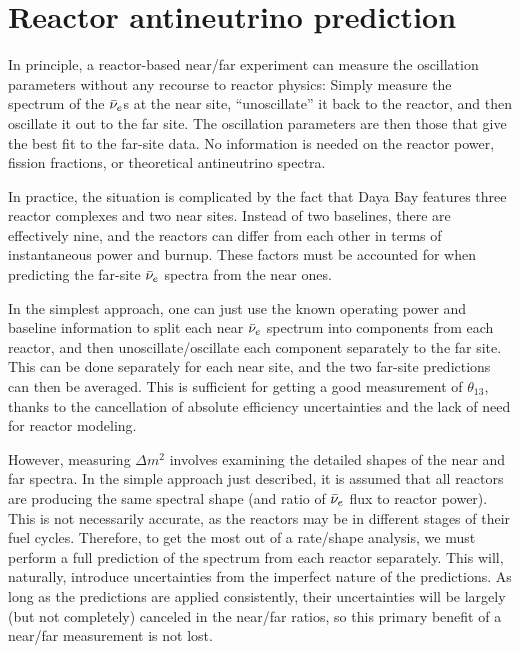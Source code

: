 \documentclass[../thesis.tex]{subfiles}
\begin{document}
\chapter{Reactor antineutrino prediction}
\label{chap:reactor}

\begin{comment}
Note to self: See Kam-Biu's comments on first page of Reactor.pdf. Add SNF plot from DocDB. Also NE corrections (tabulate or plot, take from [Lewis] or [Mueller]?)
\end{comment}

In principle, a reactor-based near/far experiment can measure the oscillation parameters without any recourse to reactor physics: Simply measure the spectrum of the $\bar\nu_e$s at the near site, ``unoscillate'' it back to the reactor, and then oscillate it out to the far site. The oscillation parameters are then those that give the best fit to the far-site data. No information is needed on the reactor power, fission fractions, or theoretical antineutrino spectra.

In practice, the situation is complicated by the fact that Daya Bay features three reactor complexes and two near sites. Instead of two baselines, there are effectively nine, and the reactors can differ from each other in terms of instantaneous power and burnup. These factors must be accounted for when predicting the far-site $\bar\nu_e$ spectra from the near ones.

In the simplest approach, one can just use the known operating power and baseline information to split each near $\bar\nu_e$ spectrum into components from each reactor, and then unoscillate/oscillate each component separately to the far site. This can be done separately for each near site, and the two far-site predictions can then be averaged. This is sufficient for getting a good measurement of $\theta_{13}$, thanks to the cancellation of absolute efficiency uncertainties and the lack of need for reactor modeling.

However, measuring $\Delta m^2$ involves examining the detailed shapes of the near and far spectra. In the simple approach just described, it is assumed that all reactors are producing the same spectral shape (and ratio of $\bar\nu_e$ flux to reactor power). This is not necessarily accurate, as the reactors may be in different stages of their fuel cycles. Therefore, to get the most out of a rate/shape analysis, we must perform a full prediction of the spectrum from each reactor separately. This will, naturally, introduce uncertainties from the imperfect nature of the predictions. As long as the predictions are applied consistently, their uncertainties will be largely (but not completely) canceled in the near/far ratios, so this primary benefit of a near/far measurement is not lost.
\end{document}
